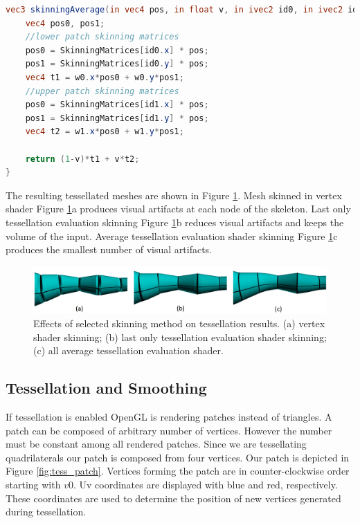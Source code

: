 \linespread{1.2}
\begin{lstlisting}[language=GLSL,caption={Linear Blend Skinning implemented in tessellation evaluation shader, with avaraging of skinning information from all patch vertices.},label={lst:te_avg_skin}]
vec3 skinningAverage(in vec4 pos, in float v, in ivec2 id0, in ivec2 id1, in vec2 w0, in vec2 w1, in mat4 SkinningMatrices[SKINNING_MATRICES]) {
	vec4 pos0, pos1;
	//lower patch skinning matrices
	pos0 = SkinningMatrices[id0.x] * pos;
	pos1 = SkinningMatrices[id0.y] * pos;
	vec4 t1 = w0.x*pos0 + w0.y*pos1;
	//upper patch skinning matrices
	pos0 = SkinningMatrices[id1.x] * pos;
	pos1 = SkinningMatrices[id1.y] * pos;
	vec4 t2 = w1.x*pos0 + w1.y*pos1;

	return (1-v)*t1 + v*t2;
}
\end{lstlisting} 
\linespread{1.5}

The resulting tessellated meshes are shown in Figure \ref{fig:tess_skin_comp}.
Mesh skinned in vertex shader Figure \ref{fig:tess_skin_comp}a produces visual artifacts at each node of the skeleton.
Last only tessellation evaluation skinning Figure \ref{fig:tess_skin_comp}b reduces visual artifacts and keeps the volume of the input.
Average tessellation evaluation shader skinning Figure \ref{fig:tess_skin_comp}c produces the smallest number of visual artifacts.

\begin{figure}[h]
    \centering
    \includegraphics[width=\textwidth]{images/tess_comp}
    \caption[Skinning and Tessellation]{Effects of selected skinning method on tessellation results. (a) vertex shader skinning; (b) last only tessellation evaluation shader skinning; (c) all average tessellation evaluation shader.}
    \label{fig:tess_skin_comp}
\end{figure}

\subsection{Tessellation and Smoothing}

If tessellation is enabled OpenGL is rendering patches instead of triangles.
A patch can be composed of arbitrary number of vertices.
However the number must be constant among all rendered patches.
Since we are tessellating quadrilaterals our patch is composed from four vertices.
Our patch is depicted in Figure \ref{fig:tess_patch}.
Vertices forming the patch are in counter-clockwise order starting with $v0$.
Uv coordinates are displayed with blue and red, respectively.
These coordinates are used to determine the position of new vertices generated during tessellation.

